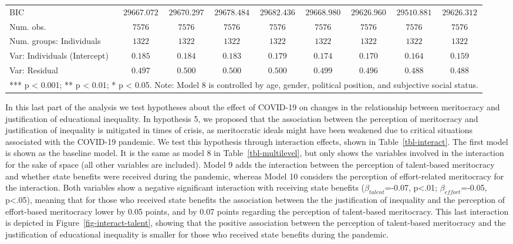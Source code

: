 \documentclass[
  10pt]{article}
\begin{document}
\begin{table}
{\begin{center}
{\begin{tabular}{l c c c c c c c c}
BIC                                         & $29667.072$    & $29670.297$    & $29678.484$    & $29682.436$    & $29668.980$    & $29626.960$    & $29510.881$    & $29626.312$    \\
Num. obs.                                   & $7576$         & $7576$         & $7576$         & $7576$         & $7576$         & $7576$         & $7576$         & $7576$         \\
Num. groups: Individuals                    & $1322$         & $1322$         & $1322$         & $1322$         & $1322$         & $1322$         & $1322$         & $1322$         \\
Var: Individuals (Intercept)                & $0.185$        & $0.184$        & $0.183$        & $0.179$        & $0.174$        & $0.170$        & $0.164$        & $0.159$        \\
Var: Residual                               & $0.497$        & $0.500$        & $0.500$        & $0.500$        & $0.499$        & $0.496$        & $0.488$        & $0.488$        \\
\hline
\multicolumn{9}{l}{\scriptsize{*** p < 0.001; ** p < 0.01; * p < 0.05.
Note: Model 8 is controlled by age, gender, political position, and subjective social status.}}
\end{tabular}
}
\label{table:coefficients}
\end{center}

}

\end{table}%

In this last part of the analysis we test hypotheses about the effect of
COVID-19 on changes in the relationship between meritocracy and
justification of educational inequality. In hypothesis 5, we proposed
that the association between the perception of meritocracy and
justification of inequality is mitigated in times of crisis, as
meritocratic ideals might have been weakened due to critical situations
associated with the COVID-19 pandemic. We test this hypothesis through
interaction effects, shown in Table~\ref{tbl-interact}. The first model
is shown as the baseline model. It is the same as model 8 in
Table~\ref{tbl-multilevel}, but only shows the variables involved in the
interaction for the sake of space (all other variables are included).
Model 9 adds the interaction between the perception of talent-based
meritocracy and whether state benefits were received during the
pandemic, whereas Model 10 considers the perception of effort-related
meritocracy for the interaction. Both variables show a negative
significant interaction with receiving state benefits
(\(\beta_{talent}\)=-0.07, p\textless.01; \(\beta_{effort}\)=-0.05,
p\textless.05), meaning that for those who received state benefits the
association between the the justification of inequality and the
perception of effort-based meritocracy lower by 0.05 points, and by 0.07
points regarding the perception of talent-based meritocracy. This last
interaction is depicted in Figure~\ref{fig-interact-talent}, showing
that the positive association between the perception of talent-based
meritocracy and the justification of educational inequality is smaller
for those who received state benefits during the pandemic.
\end{document}
